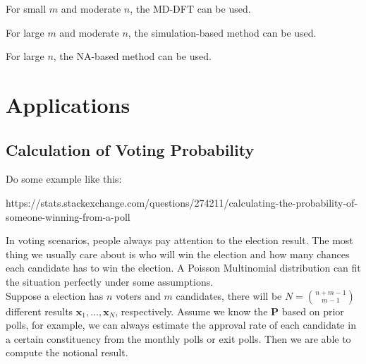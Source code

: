 \documentclass[12pt]{article}
\newcommand{\Pmat}{\mathbf{P}}
\begin{document}
For small $m$ and moderate $n$, the MD-DFT can be used.

For large $m$ and moderate $n$, the simulation-based method can be used.

For large $n$, the NA-based method can be used.

\section{Applications}
\subsection{Calculation of Voting Probability}


Do some example like this:

https://stats.stackexchange.com/questions/274211/calculating-the-probability-of-someone-winning-from-a-poll


In voting scenarios, people always pay attention to the election result. The most thing we usually care about is who will win the election and how many chances each candidate has to win the election. A Poisson Multinomial distribution can fit the situation perfectly under some assumptions.\\

Suppose a election has $n$ voters and $m$ candidates, there will be $N = \binom{n+m-1}{m-1}$ different results $\boldsymbol{x}_1,\dots, \boldsymbol{x}_N$, respectively. Assume we know the $\Pmat$ based on prior polls, for example, we can always estimate the approval rate of each candidate in a certain constituency from the monthly polls or exit polls. Then we are able to compute the notional result.\\
\end{document}

